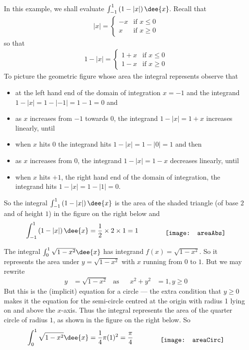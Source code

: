 \begin{eg}\label{eg:INTtriangleB}
In this example, we shall evaluate $\int_{-1}^1 \left(1-|x|\right)\dee{x}$.
Recall that
\begin{align*}
|x|=\begin{cases} -x &\text{if $x\le 0$}\\
                   x &\text{if $x\ge 0$}
    \end{cases}
\end{align*}
so that
\begin{align*}
1-|x|=\begin{cases} 1+x &\text{if $x\le 0$}\\
                    1-x &\text{if $x\ge 0$}
    \end{cases}
\end{align*}
To picture the geometric figure whose area the integral represents
observe that
\begin{itemize}\itemsep1pt \parskip0pt  %
\item
at the left hand end of the domain of integration $x=-1$ and
the integrand $1-|x|=1-|-1|=1-1=0$ and
\item
as $x$ increases from $-1$ towards $0$, the integrand $1-|x|=1+x$ increases
linearly, until
\item
when $x$ hits $0$ the integrand hits  $1-|x|=1-|0|=1$ and then
\item
as $x$ increases from $0$, the integrand $1-|x|=1-x$ decreases
linearly, until
\item
when $x$ hits $+1$, the right hand end of the domain of integration, the
integrand hits
$1-|x|=1-|1|=0$.
\end{itemize}
So the integral $\int_{-1}^1 \left(1-|x|\right)\dee{x}$  is the area of
the shaded triangle (of base $2$ and of height $1$) in the figure on
the right below and
\begin{align*}
\int_{-1}^1 \left(1-|x|\right)\dee{x} = \frac{1}{2}\times 2\times 1 =
1\qquad\qquad
\raisebox{-0.5\height}{\texttt{[image: areaAbs]}}
\end{align*}
\end{eg}

\vskip0.15in
\begin{eg}\label{eg quarter circle}
The integral $\int_0^1 \sqrt{1-x^2}\dee{x}$  has integrand $f(x)=\sqrt{1-x^2}$.
So it represents the area under $y=\sqrt{1-x^2}$ with $x$ running from
$0$ to $1$. But we may rewrite
\begin{align*}
  y&=\sqrt{1-x^2} &\text{as}&& x^2+y^2&= 1, y\geq 0
\end{align*}
But this is the (implicit) equation for a circle --- the extra condition that
$y\geq0$
makes it the equation for the semi-circle centred at the origin with radius 1
lying on
and above the $x$-axis. Thus the integral represents the area of the quarter
circle of
radius $1$, as shown in the figure on the right below. So
\begin{align*}
\int_0^1 \sqrt{1-x^2}\dee{x} = \frac{1}{4}\pi(1)^2 = \frac{\pi}{4}\qquad\qquad
\raisebox{-0.5\height}{\texttt{[image: areaCirc]}}
\end{align*}
\end{eg}

